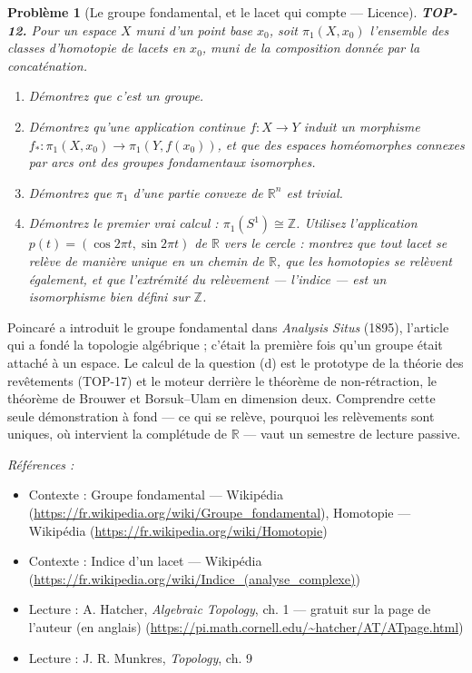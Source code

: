 \documentclass[11pt]{article}
\newtheorem{problem}{Problème}
\newenvironment{refs}{\par\small\noindent\emph{Références :}\begin{itemize}\setlength\itemsep{0pt}}{\end{itemize}\normalsize}
\begin{document}
\begin{problem}[{Le groupe fondamental, et le lacet qui compte --- Licence}]
\textbf{TOP-12.} Pour un espace $ X $ muni d'un point base $ x_0 $, soit
$ \pi_1(X, x_0) $ l'ensemble des classes d'homotopie de lacets en $ x_0 $, muni de la composition
donnée par la concaténation.
\begin{enumerate}
\item[(a)] Démontrez que c'est un groupe.
\item[(b)] Démontrez qu'une application continue $ f : X \to Y $ induit un morphisme
$ f_* : \pi_1(X, x_0) \to \pi_1(Y, f(x_0)) $, et que des espaces homéomorphes connexes par arcs ont
des groupes fondamentaux isomorphes.
\item[(c)] Démontrez que $ \pi_1 $ d'une partie convexe de $ \mathbb{R}^n $ est trivial.
\item[(d)] Démontrez le premier vrai calcul : $ \pi_1(S^1) \cong \mathbb{Z} $. Utilisez l'application
$ p(t) = (\cos 2\pi t, \sin 2\pi t) $ de $\mathbb{R}$ vers le cercle : montrez que tout lacet se relève de
manière unique en un chemin de $\mathbb{R}$, que les homotopies se relèvent également, et que l'extrémité du
relèvement --- l'indice --- est un isomorphisme bien défini sur $\mathbb{Z}$.
\end{enumerate}

\end{problem}

\noindent Poincaré a introduit le groupe fondamental dans \textit{Analysis Situs} (1895),
l'article qui a fondé la topologie algébrique ; c'était la première fois qu'un groupe était attaché à un
espace. Le calcul de la question (d) est le prototype de la théorie des revêtements (TOP-17) et le moteur
derrière le théorème de non-rétraction, le théorème de Brouwer et Borsuk--Ulam en dimension deux.
Comprendre cette seule démonstration à fond --- ce qui se relève, pourquoi les relèvements sont uniques, où
intervient la complétude de $\mathbb{R}$ --- vaut un semestre de lecture passive.

\begin{refs}
\item Contexte : Groupe fondamental --- Wikipédia (\url{https://fr.wikipedia.org/wiki/Groupe_fondamental}), Homotopie --- Wikipédia (\url{https://fr.wikipedia.org/wiki/Homotopie})
\item Contexte : Indice d'un lacet --- Wikipédia (\url{https://fr.wikipedia.org/wiki/Indice_(analyse_complexe)})
\item Lecture : A. Hatcher, \textit{Algebraic Topology}, ch. 1 --- gratuit sur la page de l'auteur (en anglais) (\url{https://pi.math.cornell.edu/~hatcher/AT/ATpage.html})
\item Lecture : J. R. Munkres, \textit{Topology}, ch. 9
\end{refs}
\end{document}

